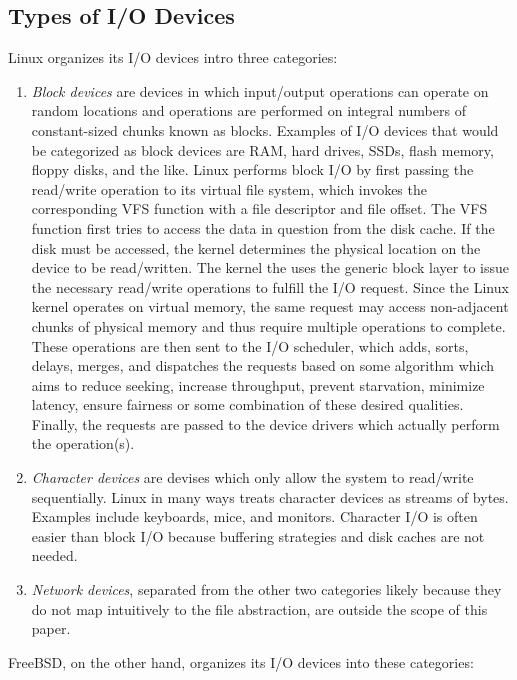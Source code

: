 \documentclass[onecolumn, draftclsnofoot,10pt, compsoc]{IEEEtran}
\begin{document}
\subsection{Types of I/O Devices}
Linux organizes its I/O devices intro three categories:
\begin{enumerate}
\item \textit{Block devices} are devices in which input/output operations can operate on random locations and operations are performed on integral numbers of constant-sized chunks known as blocks. Examples of I/O devices that would be categorized as block devices are RAM, hard drives, SSDs, flash memory, floppy disks, and the like. Linux performs block I/O by first passing the read/write operation to its virtual file system, which invokes the corresponding VFS function with a file descriptor and file offset. The VFS function first tries to access the data in question from the disk cache. If the disk must be accessed, the kernel determines the physical location on the device to be read/written. The kernel the uses the generic block layer to issue the necessary read/write operations to fulfill the I/O request. Since the Linux kernel operates on virtual memory, the same request may access non-adjacent chunks of physical memory and thus require multiple operations to complete. These operations are then sent to the I/O scheduler, which adds, sorts, delays, merges, and dispatches the requests based on some algorithm which aims to reduce seeking, increase throughput, prevent starvation, minimize latency, ensure fairness or some combination of these desired qualities. Finally, the requests are passed to the device drivers which actually perform the operation(s). 
\item \textit{Character devices} are devises which only allow the system to read/write sequentially. Linux in many ways treats character devices as streams of bytes. Examples include keyboards, mice, and monitors. Character I/O is often easier than block I/O because buffering strategies and disk caches are not needed.
\item \textit{Network devices}, separated from the other two categories likely because they do not map intuitively to the file abstraction, are outside the scope of this paper.
\end{enumerate}
FreeBSD, on the other hand, organizes its I/O devices into these categories:
\end{document}
